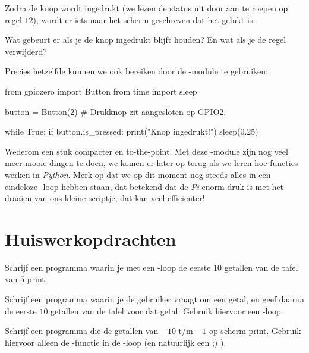 Zodra de knop wordt ingedrukt (we lezen de status uit door  aan te roepen op regel $12$), wordt er iets naar het scherm geschreven dat het gelukt is.

\begin{exercise}
Wat gebeurt er als je de knop ingedrukt blijft houden? En wat als je de  regel verwijderd?
\end{exercise}

Precies hetzelfde kunnen we ook bereiken door de -module te gebruiken:
\begin{python}
from gpiozero import Button
from time import sleep 

button = Button(2)  # Drukknop zit aangesloten op GPIO2.

while True: 
    if button.is_pressed: 
        print("Knop ingedrukt!") 
        sleep(0.25)
\end{python}

Wederom een stuk compacter en to-the-point. Met deze -module zijn nog veel meer mooie dingen te doen, we komen er later op terug als we leren hoe functies werken in \textit{Python}. Merk op dat we op dit moment nog steeds alles in een eindeloze -loop hebben staan, dat betekend dat de \textit{Pi} enorm druk is met het draaien van ons kleine scriptje, dat kan veel efficiënter!

\newpage

\section{Huiswerkopdrachten}
\begin{exercise}
Schrijf een programma waarin je met een -loop de eerste $10$ getallen van de tafel van $5$ print.
\end{exercise}

\begin{exercise}
Schrijf een programma waarin je de gebruiker vraagt om een getal, en geef daarna de eerste $10$ getallen van de tafel voor dat getal. Gebruik hiervoor een -loop.
\end{exercise}

\begin{exercise}
Schrijf een programma die de getallen van $-10$ t/m $-1$ op scherm print. Gebruik hiervoor alleen de -functie in de -loop (en natuurlijk een  ;) ).
\end{exercise}

